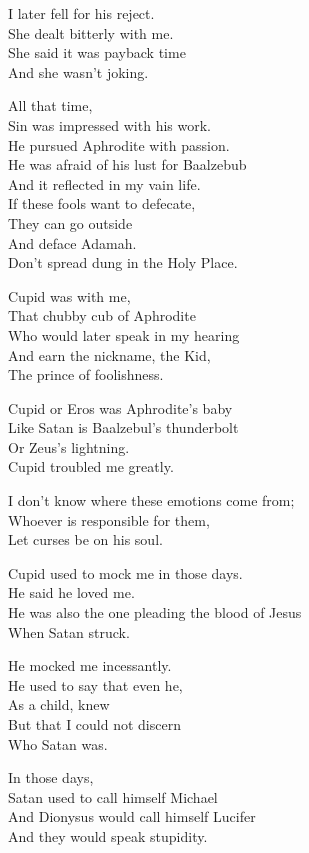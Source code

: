 \documentclass[
]{book}
\begin{document}
I later fell for his reject.\\
She dealt bitterly with me.\\
She said it was payback time\\
And she wasn't joking.

All that time,\\
Sin was impressed with his work.\\
He pursued Aphrodite with passion.\\
He was afraid of his lust for Baalzebub\\
And it reflected in my vain life.\\
If these fools want to defecate,\\
They can go outside\\
And deface Adamah.\\
Don't spread dung in the Holy Place.

Cupid was with me,\\
That chubby cub of Aphrodite\\
Who would later speak in my hearing\\
And earn the nickname, the Kid,\\
The prince of foolishness.

Cupid or Eros was Aphrodite's baby\\
Like Satan is Baalzebul's thunderbolt\\
Or Zeus's lightning.\\
Cupid troubled me greatly.

I don't know where these emotions come from;\\
Whoever is responsible for them,\\
Let curses be on his soul.

Cupid used to mock me in those days.\\
He said he loved me.\\
He was also the one pleading the blood of Jesus\\
When Satan struck.

He mocked me incessantly.\\
He used to say that even he,\\
As a child, knew\\
But that I could not discern\\
Who Satan was.

In those days,\\
Satan used to call himself Michael\\
And Dionysus would call himself Lucifer\\
And they would speak stupidity.
\end{document}
